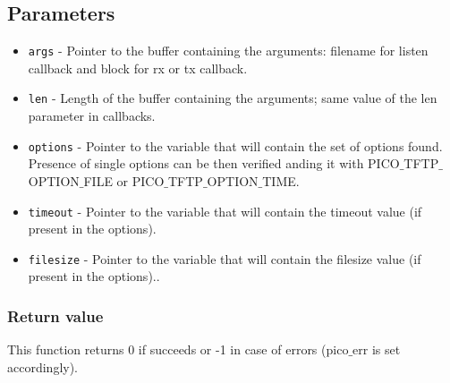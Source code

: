\subsection*{Parameters}
\begin{itemize}[noitemsep]
\item \texttt{args} - Pointer to the buffer containing the arguments: filename for listen callback and block for rx or tx callback.
\item \texttt{len} - Length of the buffer containing the arguments; same value of the len parameter in callbacks.
\item \texttt{options} - Pointer to the variable that will contain the set of options found. Presence of single options can be then verified anding it with PICO$\_$TFTP$\_$OPTION$\_$FILE or PICO$\_$TFTP$\_$OPTION$\_$TIME.
\item \texttt{timeout} - Pointer to the variable that will contain the timeout value (if present in the options).
\item \texttt{filesize} - Pointer to the variable that will contain the filesize value (if present in the options)..
\end{itemize}

\subsubsection*{Return value}
This function returns 0 if succeeds or -1 in case of errors (pico$\_$err is set accordingly).


